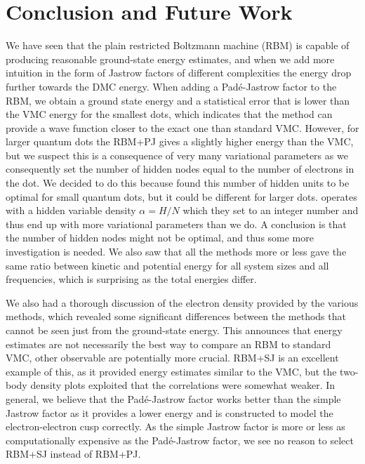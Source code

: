 \chapter{Conclusion and Future Work} \label{sec:conclusion}
We have seen that the plain restricted Boltzmann machine (RBM) is capable of producing reasonable ground-state energy estimates, and when we add more intuition in the form of Jastrow factors of different complexities the energy drop further towards the DMC energy. When adding a Padé-Jastrow factor to the RBM, we obtain a ground state energy and a statistical error that is lower than the VMC energy for the smallest dots, which indicates that the method can provide a wave function closer to the exact one than standard VMC. However, for larger quantum dots the RBM+PJ gives a slightly higher energy than the VMC, but we suspect this is a consequence of very many variational parameters as we consequently set the number of hidden nodes equal to the number of electrons in the dot. We decided to do this because \citet{nordhagen_computational_2018} found this number of hidden units to be optimal for small quantum dots, but it could be different for larger dots. \citet{carleo_solving_2017} operates with a hidden variable density $\alpha=H/N$ which they set to an integer number and thus end up with more variational parameters than we do. A conclusion is that the number of hidden nodes might not be optimal, and thus some more investigation is needed. We also saw that all the methods more or less gave the same ratio between kinetic and potential energy for all system sizes and all frequencies, which is surprising as the total energies differ.

We also had a thorough discussion of the electron density provided by the various methods, which revealed some significant differences between the methods that cannot be seen just from the ground-state energy. This announces that energy estimates are not necessarily the best way to compare an RBM to standard VMC, other observable are potentially more crucial. RBM+SJ is an excellent example of this, as it provided energy estimates similar to the VMC, but the two-body density plots exploited that the correlations were somewhat weaker. In general, we believe that the Padé-Jastrow factor works better than the simple Jastrow factor as it provides a lower energy and is constructed to model the electron-electron cusp correctly. As the simple Jastrow factor is more or less as computationally expensive as the Padé-Jastrow factor, we see no reason to select RBM+SJ instead of RBM+PJ. 

